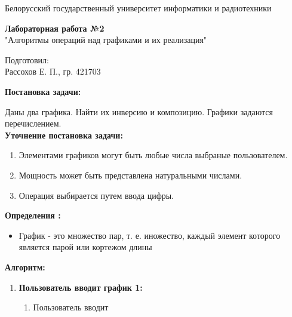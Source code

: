 \documentclass[]{article}
\begin{document}
	\begin{center}
		\par Белорусский государственный университет информатики и радиотехники
	\end{center}
	\vspace*{10cm}
	\begin{center}
		\huge
		\par \textbf{Лабораторная работа №2}\\
		\vspace{0.5cm}
		\normalsize 
		"Алгоритмы операций над графиками и их реализация"
	\end{center}
	\vspace*{8cm}
	\begin{flushright}
		\large
		Подготовил:\\
		Рассохов Е. П., гр. 421703
	\end{flushright}
	\newpage
	
	
	\large{\textbf{Постановка задачи:}}
	\par Даны два графика. Найти их инверсию и композицию. Графики задаются перечислением.\\
	
	\large{\textbf{Уточнение постановка задачи:}}
	\begin{enumerate}[1.]
		\item Элементами графиков могут быть любые числа выбраные пользователем.
		\item Мощность может быть представлена натуральными числами.
		\item Операция выбирается путем ввода цифры.
	\end{enumerate}
	\large{\textbf{Определения :}}
	\begin{itemize} 
		\item График - это множество пар, т. е. иножество, каждый элемент которого является парой или кортежом длины 
	\end{itemize}
	\large{\textbf{Алгоритм: }}
	\begin{enumerate}[1.]
		\item \textbf{Пользователь вводит график 1:} 
		\begin{enumerate}[{1}. 1.]
			\item Пользователь вводит 
		\end{enumerate}
	\end{enumerate}
\end{document}
